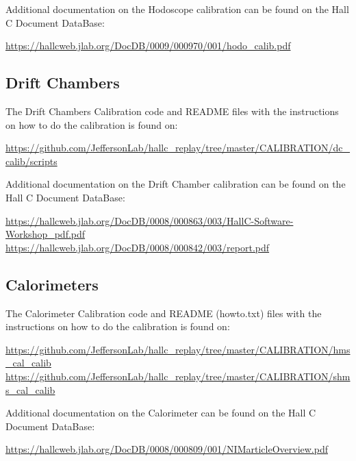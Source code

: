 \documentclass[14pt]{article}
\begin{document}
Additional documentation on the Hodoscope calibration can be found on the Hall C Document DataBase:
\begin{center}
  \url{https://hallcweb.jlab.org/DocDB/0009/000970/001/hodo_calib.pdf}
\end{center}

\subsection{Drift Chambers}
The Drift Chambers Calibration code and README files with the instructions on how to do the calibration is found on:
\begin{center}
\url{https://github.com/JeffersonLab/hallc_replay/tree/master/CALIBRATION/dc_calib/scripts}  
\end{center}

Additional documentation on the Drift Chamber calibration can be found on the Hall C Document DataBase:
\begin{center}
  \url{https://hallcweb.jlab.org/DocDB/0008/000863/003/HallC-Software-Workshop_pdf.pdf}\\
  \url{https://hallcweb.jlab.org/DocDB/0008/000842/003/report.pdf}
\end{center}
\subsection{Calorimeters}
The Calorimeter Calibration code and README (howto.txt) files with the instructions on how to do the calibration is found on:
\begin{center}
  \url{https://github.com/JeffersonLab/hallc_replay/tree/master/CALIBRATION/hms_cal_calib} \\
  \url{https://github.com/JeffersonLab/hallc_replay/tree/master/CALIBRATION/shms_cal_calib}
\end{center}

Additional documentation on the Calorimeter can be found on the Hall C Document DataBase:
\begin{center}
\url{https://hallcweb.jlab.org/DocDB/0008/000809/001/NIMarticleOverview.pdf}
\end{center}
\end{document}
